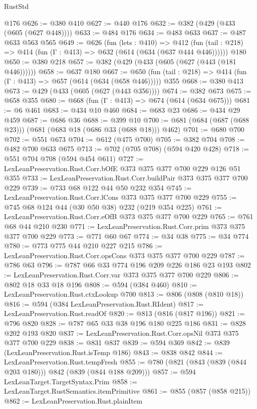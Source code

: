 \begin{lexlean}{RustStd}
\begin{coremodule}
    @176
@626 := @380 @410
@627 := @440 @176
@632 := @382 (@429 (@433 (@605 (@627 @448))))
@633 := @484 @176
@634 := @483 @633
@637 := @487 @633 @563 @565
@649 := @626
    (fun (lets : @410) =>
    @412 (fun (tail : @218) => @414 (fun (Γ : @413) => @632 (@614 (@634 (@637 @444 @446))))))
    @180
@650 := @380 @218
@657 := @382 (@429 (@433 (@605 (@627 (@443 (@181 @446))))))
@658 := @637 @180
@667 := @650 (fun (tail : @218) => @414 (fun (Γ : @413) => @657 (@614 (@634 (@658 @446))))) @355
@668 := @380 @413
@673 := @429 (@433 (@605 (@627 (@443 @356))))
@674 := @382 @673
@675 := @658 @355
@680 := @668 (fun (Γ : @413) => @674 (@614 (@634 @675)))
@681 := @6 @461
@683 := @434 @10 @460
@684 := @683 @23
@686 := @434 @29 @459
@687 := @686 @36
@688 := @399 @10
@700 := @681 (@684 (@687 (@688 @23))) (@681 (@683 @18 (@686 @33 (@688 @18))) @462)
@701 := @680 @700
@702 := @551 @673
@704 := @612 (@475 @700)
@705 := @382 @704
@708 := @482 @700 @633 @675
@713 := @702 (@705 @708) (@594 @420 @428)
@718 := @551 @704 @708 (@594 @454 @611)
@727 := LexLeanPreservation.Rust.Corr.bOfE @373 @375 @377 @700 @229 @126 @51 @355
@733 := LexLeanPreservation.Rust.Corr.buildPair @373 @375 @377 @700 @229
@739 := @733 @68 @122 @44 @50 @232 @354
@745 := LexLeanPreservation.Rust.Corr.lCons @373 @375 @377 @700 @229
@755 := @745 @68 @124 @44 (@30 @50 @38) @232 (@219 @354 @225)
@761 := LexLeanPreservation.Rust.Corr.eOfB @373 @375 @377 @700 @229
@765 := @761 @68 @44 @210 @230
@771 := LexLeanPreservation.Rust.Corr.prim @373 @375 @377 @700 @229
@773 := @771 @60 @67
@774 := @34 @38
@775 := @34 @774
@780 := @773 @775 @44 @210 @227 @215
@786 := LexLeanPreservation.Rust.Corr.opsCons @373 @375 @377 @700 @229
@787 := @786 @63
@796 := @787 @66 @33 @774 @196 @209 @226 @186 @23 @193
@802 := LexLeanPreservation.Rust.Corr.var @373 @375 @377 @700 @229
@806 := @802 @18 @33 @18 @196
@808 := @594 (@384 @460)
@810 := LexLeanPreservation.Rust.ctxLookup @700
@813 := @806 (@808 (@810 @18))
@816 := @594 (@384 LexLeanPreservation.Rust.RIdent)
@817 := LexLeanPreservation.Rust.readOf
@820 := @813 (@816 (@817 @196))
@821 := @796 @820
@828 := @787 @65 @33 @38 @196 @180 @225 @186
@831 := @828 @202 @193 @820
@837 := LexLeanPreservation.Rust.Corr.opsNil @373 @375 @377 @700 @229
@838 := @831 @837
@839 := @594 @369
@842 := @839 (LexLeanPreservation.Rust.isTemp @186)
@843 := @838 @842
@844 := LexLeanPreservation.Rust.tempFresh
@855 := @780 (@821 (@843 (@839 (@844 @203 @180))) @842 (@839 (@844 @188 @209)))
@857 := @594 LexLeanTarget.TargetSyntax.Prim
@858 := LexLeanTarget.RustSemantics.itemPrimitive
@861 := @855 (@857 (@858 @215))
@862 := LexLeanPreservation.Rust.plainItem

\end{coremodule}
\end{lexlean}
